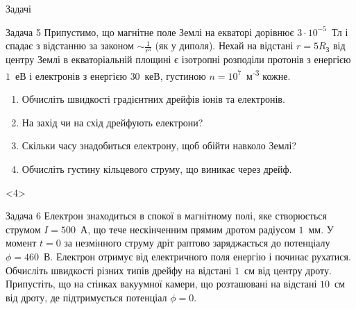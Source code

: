 \documentclass[]{beamer}
\begin{document}
\begin{frame}{Задачі}{}
\begin{onlyenv}
\begin{exampleblock}{Задача 5}
                Припустимо, що магнітне поле Землі на екваторі дорівнює $3\cdot10^{-5}$~Тл і спадає з відстанню за законом $\sim \frac{1}{r^3}$ (як у диполя).
                Нехай на відстані $r = 5R_\text{З}$ від центру Землі в екваторіальній площині є ізотропні розподіли протонів з енергією $1$~еВ і електронів з енергією $30$~кеВ, густиною $n = 10^7$~м\textsuperscript{-3} кожне.
                \begin{enumerate}
                    \item Обчисліть швидкості градієнтних дрейфів іонів та електронів.
                    \item На захід чи на схід дрейфують електрони?
                    \item Скільки часу знадобиться електрону, щоб обійти навколо Землі?
                    \item Обчисліть густину кільцевого струму, що виникає через дрейф.
                \end{enumerate}
        \end{exampleblock}
    \end{onlyenv}
    \begin{onlyenv}<4>
       \begin{exampleblock}{Задача 6}\justifying%
           Електрон знаходиться в спокої в магнітному полі, яке створюється струмом $I = 500$~А, що тече нескінченним прямим дротом радіусом $1$~мм. У момент $t = 0$ за незмінного струму дріт раптово заряджається до потенціалу $\phi = 460$~В. Електрон отримує від  електричного поля енергію і починає рухатися.
           Обчисліть швидкості різних типів дрейфу на відстані $1$~см від центру дроту. Припустіть, що на стінках вакуумної камери, що розташовані на відстані $10$~см від дроту, де підтримується потенціал $\phi=0$.
       \end{exampleblock}
    \end{onlyenv}
\end{frame}
\end{document}
